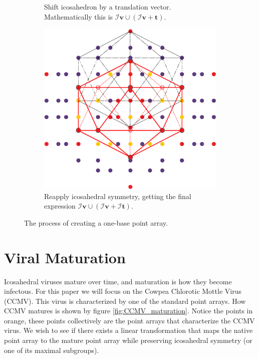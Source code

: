 \documentclass[a4paper,10pt]{article}
\theoremstyle{plain}
\theoremstyle{definition}
\theoremstyle{remark}
\renewcommand{\vec}[1]{\textbf{#1}}
\begin{document}
\begin{figure}[h]
\begin{subfigure}{0.3\textwidth}
		\caption{Shift icosahedron by a translation vector. Mathematically this is \mbox{\(\mathcal{I}\vec{v} \cup (\mathcal{I}\vec{v} + \vec{t})\)}.}
	\end{subfigure}
	\hfill
	\begin{subfigure}{0.35\textwidth}
		\centering
		\includegraphics[width=\textwidth]{images/p_arr_construction_3.pdf}
		\caption{Reapply icosahedral symmetry, getting the final expression \(\mathcal{I}\vec{v} \cup (\mathcal{I}\vec{v} + \mathcal{I}\vec{t})\).}
	\end{subfigure}
	\caption{The process of creating a one-base point array.}
	\label{fig:point_array_construction}
\end{figure}

\section{Viral Maturation}
Icosahedral viruses mature over time, and maturation is how they become infectous.
For this paper we will focus on the Cowpea Chlorotic Mottle Virus (CCMV).
This virus is characterized by one of the standard point arrays.
How CCMV matures is shown by figure \ref{fig:CCMV_maturation}.
Notice the points in orange, these points collectively are the point arrays that characterize the CCMV virus.
We wish to see if there exists a linear transformation that maps the native point array to the mature point array while preserving icosahedral symmetry (or one of its maximal subgroups).
\end{document}
